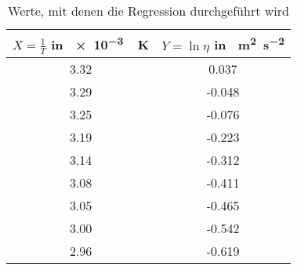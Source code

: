 \begin{table}[h!]
\centering
\begin{tabular}{c|c}
	$X=\frac{1}{T}$ in \SI{e-3}{\per\kelvin} & $Y=\ln\eta$ in \si{\ln\metre\squared\per\second\squared} \\
	\hline
	3.32 & 0.037 \\
	3.29 & -0.048 \\
	3.25 & -0.076 \\
	3.19 & -0.223 \\
	3.14 & -0.312 \\
	3.08 & -0.411 \\
	3.05 & -0.465 \\
	3.00 & -0.542 \\
	2.96 & -0.619
\end{tabular}
\caption{Werte, mit denen die Regression durchgeführt wird}
\label{fig:DatenRegression}
\end{table}
